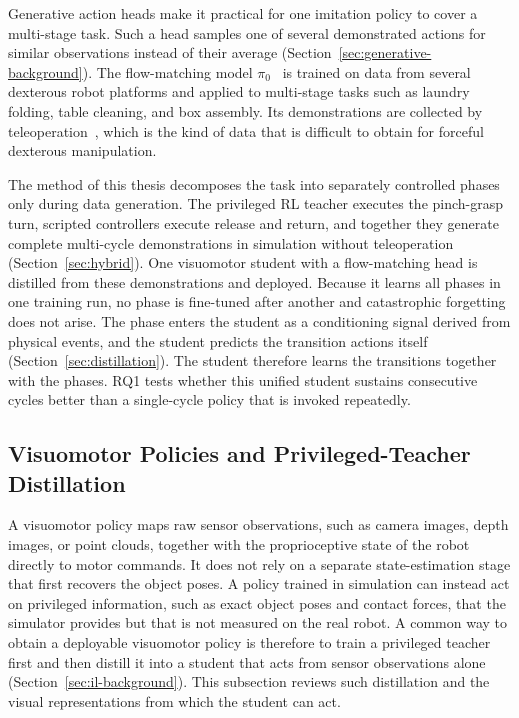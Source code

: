 Generative action heads make it practical for one imitation policy to cover a multi-stage task. Such a head samples one of several demonstrated actions for similar observations instead of their average (Section~\ref{sec:generative-background}). The flow-matching model $\pi_0$~\cite{Black2026} is trained on data from several dexterous robot platforms and applied to multi-stage tasks such as laundry folding, table cleaning, and box assembly. Its demonstrations are collected by teleoperation~\cite{Black2026}, which is the kind of data that is difficult to obtain for forceful dexterous manipulation.

The method of this thesis decomposes the task into separately controlled phases only during data generation. The privileged \ac{RL} teacher executes the pinch-grasp turn, scripted controllers execute release and return, and together they generate complete multi-cycle demonstrations in simulation without teleoperation (Section~\ref{sec:hybrid}). One visuomotor student with a flow-matching head is distilled from these demonstrations and deployed. Because it learns all phases in one training run, no phase is fine-tuned after another and catastrophic forgetting does not arise. The phase enters the student as a conditioning signal derived from physical events, and the student predicts the transition actions itself (Section~\ref{sec:distillation}). The student therefore learns the transitions together with the phases. RQ1 tests whether this unified student sustains consecutive cycles better than a single-cycle policy that is invoked repeatedly.

\subsection{Visuomotor Policies and Privileged-Teacher Distillation}\label{sec:related-visuomotor}

A visuomotor policy maps raw sensor observations, such as camera images, depth images, or point clouds, together with the proprioceptive state of the robot directly to motor commands. It does not rely on a separate state-estimation stage that first recovers the object poses. A policy trained in simulation can instead act on privileged information, such as exact object poses and contact forces, that the simulator provides but that is not measured on the real robot. A common way to obtain a deployable visuomotor policy is therefore to train a privileged teacher first and then distill it into a student that acts from sensor observations alone (Section~\ref{sec:il-background}). This subsection reviews such distillation and the visual representations from which the student can act.


